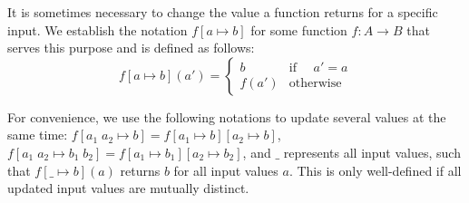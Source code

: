 \documentclass{article}
\begin{document}
	It is sometimes necessary to change the value a function returns for a specific input. We establish the notation $f[a \mapsto b]$
	for some function $f : A \rightarrow B$ that serves this purpose and is defined as follows:
	\begin{equation*}
	f[a \mapsto b](a') = \begin{cases}
		b & \text{if } \quad a' = a \\
		f(a') & \text{otherwise}
	\end{cases}
	\end{equation*}

	For convenience, we use the following notations to update several values at the same time: 
	$f[a_1 \; a_2 \mapsto b] = f[a_1 \mapsto b][a_2 \mapsto b]$, $f[a_1 \; a_2 \mapsto b_1 \; b_2] = f[a_1 \mapsto b_1][a_2 \mapsto b_2]$, and $\_$ represents all
	input values, such that $f[ \_ \mapsto b](a)$ returns $b$ for all input values $a$.	This is only well-defined if all updated input values are
	mutually distinct.
\end{document}
